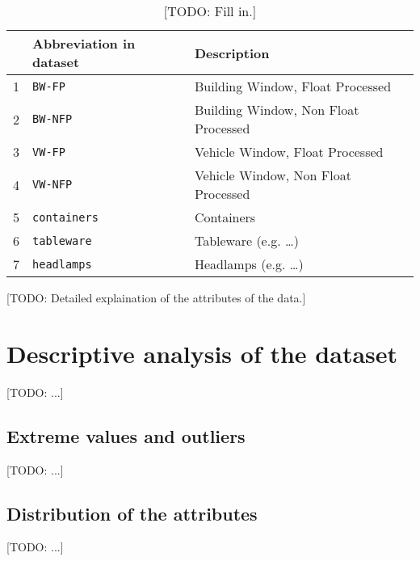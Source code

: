 \documentclass[dtu]{dtuarticle}
\newcommand{\todo}[1]{\color{red}[TODO: #1]\color{black}}
\begin{document}
	\begin{table}[h!]
		\centering
		\begin{tabular}{r|l|l}
			\textbf{} & \textbf{Abbreviation in dataset} & \textbf{Description}                 \\ \hline \hline
			1                    & \texttt{BW-FP}                        & Building Window, Float Processed     \\ \hline
			2                    & \texttt{BW-NFP}                       & Building Window, Non Float Processed \\ \hline
			3                    & \texttt{VW-FP}                        & Vehicle Window, Float Processed      \\ \hline
			4                    & \texttt{VW-NFP}                       & Vehicle Window, Non Float Processed  \\ \hline
			5                    & \texttt{containers}                   & Containers                           \\ \hline
			6                    & \texttt{tableware}                    & Tableware (e.g. \dots)               \\ \hline
			7                    & \texttt{headlamps}                    & Headlamps (e.g. \dots)               \\
		\end{tabular}
		\caption{\todo{Fill in.}}
		\label{table:types}
	\end{table}

	\todo{Detailed explaination of the attributes of the data.}

	\section{Descriptive analysis of the dataset}

	\todo{...}

	\subsection{Extreme values and outliers}

	\todo{...}

	\subsection{Distribution of the attributes}

	\todo{...}
\end{document}
